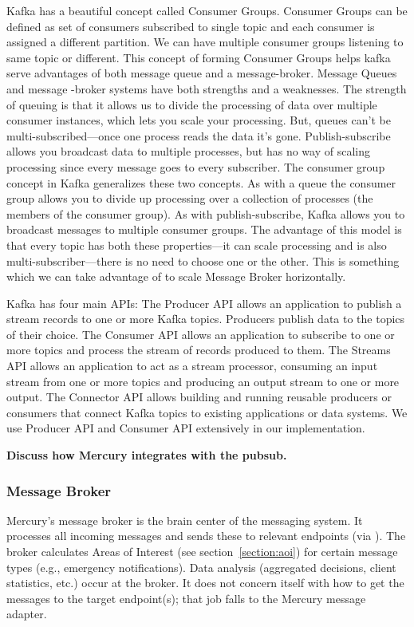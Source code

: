 {Kafka has a beautiful concept called Consumer Groups. Consumer Groups can be 
defined as set of consumers subscribed to single topic and each consumer is 
assigned a different partition. We can have multiple consumer groups listening 
to same topic or different. This concept of forming Consumer Groups helps kafka
serve advantages of both message queue and a message-broker. Message Queues and 
message -broker systems have both strengths and a weaknesses. The strength of
queuing is that it allows us to divide the processing of data over multiple
consumer instances, which lets you scale your processing. But, queues can't be
multi-subscribed—once one process reads the data it's gone. Publish-subscribe 
allows you broadcast data to multiple processes, but has no way of scaling 
processing since every message goes to every subscriber. The consumer group 
concept in Kafka generalizes these two concepts. As with a queue the consumer 
group allows you to divide up processing over a collection of processes 
(the members of the consumer group). As with publish-subscribe,
Kafka allows you to broadcast messages to multiple consumer groups. The 
advantage of this model is that every topic has both these properties—it can 
scale processing and is also multi-subscriber—there is no need to choose one or
the other. This is something which we can take advantage of to scale Message 
Broker horizontally.


Kafka has four main APIs: The Producer API allows an application to publish a 
stream records to one or more Kafka topics. Producers publish data to the topics
of their choice. 
The Consumer API allows an application to subscribe to one
or more topics and process the stream of records produced to them. 
The Streams API allows an application to act as a stream processor, consuming an
input stream from one or more topics and producing an output stream to one or 
more output.
The Connector API allows building and running reusable producers or consumers 
that connect Kafka topics to existing applications or data systems. 
We use Producer API and Consumer API extensively in our implementation.
}

{\bf Discuss how Mercury integrates with the pubsub.}

\subsubsection{Message Broker}

Mercury's message broker is the brain center of the messaging
system. It processes all incoming messages and sends these to relevant
endpoints (via \pubsub). The broker calculates Areas of Interest (see
section~\ref{section:aoi}) for certain message types (e.g., emergency
notifications).  Data analysis (aggregated decisions, client
statistics, etc.) occur at the broker. It does not concern itself with
how to get the messages to the target endpoint(s); that job falls to
the Mercury message adapter.

